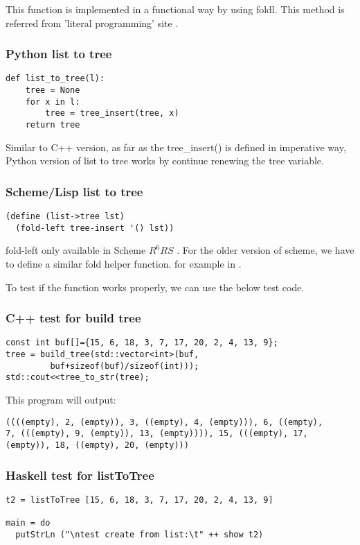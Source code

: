 \documentclass{article}
\begin{document}
This function is implemented in a functional way by using foldl. This method
is referred from 'literal programming' site \cite{literal-program}.

\subsubsection*{Python list to tree}
\lstset{language=Python}
\begin{lstlisting}
def list_to_tree(l):
    tree = None
    for x in l:
        tree = tree_insert(tree, x)
    return tree
\end{lstlisting}

Similar to C++ version, as far as the tree\_insert() is defined in imperative
way, Python version of list to tree works by continue renewing the tree variable.

\subsubsection*{Scheme/Lisp list to tree}
\lstset{language=lisp}
\begin{lstlisting}
(define (list->tree lst)
  (fold-left tree-insert '() lst))
\end{lstlisting}

fold-left only available in Scheme $R^6RS$ \cite{wiki-fold}. For the older version of
scheme, we have to define a similar fold helper function. for example in \cite{literal-program}.

To test if the function works properly, we can use the below test code.
\subsubsection*{C++ test for build tree}
\lstset{language=C++}
\begin{lstlisting}
const int buf[]={15, 6, 18, 3, 7, 17, 20, 2, 4, 13, 9};
tree = build_tree(std::vector<int>(buf, 
         buf+sizeof(buf)/sizeof(int)));
std::cout<<tree_to_str(tree);
\end{lstlisting}

This program will output:
\begin{verbatim}
((((empty), 2, (empty)), 3, ((empty), 4, (empty))), 6, ((empty), 
7, (((empty), 9, (empty)), 13, (empty)))), 15, (((empty), 17, 
(empty)), 18, ((empty), 20, (empty)))
\end{verbatim}

\subsubsection*{Haskell test for listToTree}
\lstset{language=Haskell}
\begin{lstlisting}
t2 = listToTree [15, 6, 18, 3, 7, 17, 20, 2, 4, 13, 9]

main = do
  putStrLn ("\ntest create from list:\t" ++ show t2)
\end{lstlisting}
\end{document}

